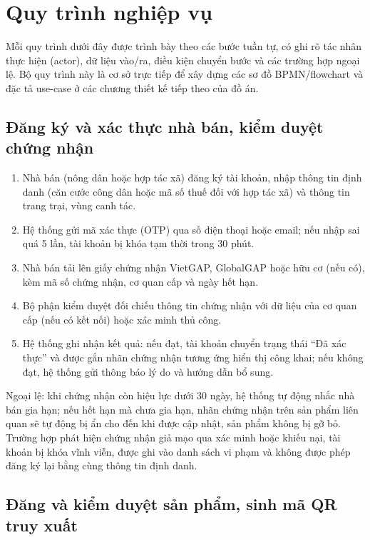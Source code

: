 \section{Quy trình nghiệp vụ}

Mỗi quy trình dưới đây được trình bày theo các bước tuần tự, có ghi rõ tác nhân thực hiện (actor), dữ liệu vào/ra, điều kiện chuyển bước và các trường hợp ngoại lệ. Bộ quy trình này là cơ sở trực tiếp để xây dựng các sơ đồ BPMN/flowchart và đặc tả use-case ở các chương thiết kế tiếp theo của đồ án.

\subsection{Đăng ký và xác thực nhà bán, kiểm duyệt chứng nhận}

\begin{enumerate}
    \item Nhà bán (nông dân hoặc hợp tác xã) đăng ký tài khoản, nhập thông tin định danh (căn cước công dân hoặc mã số thuế đối với hợp tác xã) và thông tin trang trại, vùng canh tác.
    \item Hệ thống gửi mã xác thực (OTP) qua số điện thoại hoặc email; nếu nhập sai quá 5 lần, tài khoản bị khóa tạm thời trong 30 phút.
    \item Nhà bán tải lên giấy chứng nhận VietGAP, GlobalGAP hoặc hữu cơ (nếu có), kèm mã số chứng nhận, cơ quan cấp và ngày hết hạn.
    \item Bộ phận kiểm duyệt đối chiếu thông tin chứng nhận với dữ liệu của cơ quan cấp (nếu có kết nối) hoặc xác minh thủ công.
    \item Hệ thống ghi nhận kết quả: nếu đạt, tài khoản chuyển trạng thái “Đã xác thực” và được gắn nhãn chứng nhận tương ứng hiển thị công khai; nếu không đạt, hệ thống gửi thông báo lý do và hướng dẫn bổ sung.
\end{enumerate}

Ngoại lệ: khi chứng nhận còn hiệu lực dưới 30 ngày, hệ thống tự động nhắc nhà bán gia hạn; nếu hết hạn mà chưa gia hạn, nhãn chứng nhận trên sản phẩm liên quan sẽ tự động bị ẩn cho đến khi được cập nhật, sản phẩm không bị gỡ bỏ. Trường hợp phát hiện chứng nhận giả mạo qua xác minh hoặc khiếu nại, tài khoản bị khóa vĩnh viễn, được ghi vào danh sách vi phạm và không được phép đăng ký lại bằng cùng thông tin định danh.



\subsection{Đăng và kiểm duyệt sản phẩm, sinh mã QR truy xuất}

